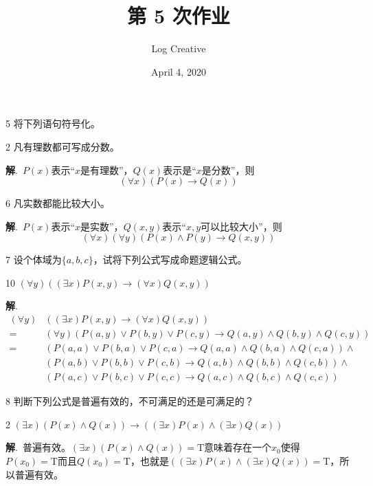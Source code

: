 \documentclass[12pt]{article}
\title{第 5 次作业}
\author{Log Creative}
\date{April 4, 2020}
\newenvironment{firstlayer}%
{\begin{list}{}{\renewcommand{\makelabel}[1]{\textbf{##1}.\hfil}
}}
{\end{list}}
\newenvironment{secondlayer}%
{\begin{list}{}{\renewcommand{\makelabel}[1]{(##1)\hfil}
}}
{\end{list}}
\providecommand{\sol}{\textbf{解}.~}
\begin{document}
\begin{CJK}{UTF8}{gbsn}

\maketitle

\begin{firstlayer}
  \item[5]将下列语句符号化。
  \begin{secondlayer}
    \item[2]凡有理数都可写成分数。
    
    \sol $P(x)$表示“$x$是有理数”，$Q(x)$表示是“$x$是分数”，则
$$
(\forall x)(P(x)\rightarrow Q(x))
$$
    \item[6]凡实数都能比较大小。
    
    \sol $P(x)$表示“$x$是实数”，$Q(x,y)$表示“$x,y$可以比较大小”，则
$$
(\forall x)(\forall y)(P(x)\wedge P(y)\rightarrow Q(x,y))
$$
  \end{secondlayer}
  \item[7]设个体域为$\{ a,b,c\}$，试将下列公式写成命题逻辑公式。
  \begin{secondlayer}
    \item[10]$(\forall y)((\exists x)P(x,y)\rightarrow (\forall x)Q(x,y))$
    
    \sol 
    \begin{align*}
      (\forall y)&((\exists x)P(x,y)\rightarrow (\forall x)Q(x,y))\\
      =&(\forall y)(P(a,y)\vee P(b,y)\vee P(c,y)\rightarrow Q(a,y)\wedge Q(b,y)\wedge Q(c,y))\\
      =&(P(a,a)\vee P(b,a)\vee P(c,a)\rightarrow Q(a,a)\wedge Q(b,a)\wedge Q(c,a))\wedge\\
      &(P(a,b)\vee P(b,b)\vee P(c,b)\rightarrow Q(a,b)\wedge Q(b,b)\wedge Q(c,b))\wedge\\
      &(P(a,c)\vee P(b,c)\vee P(c,c)\rightarrow Q(a,c)\wedge Q(b,c)\wedge Q(c,c))
    \end{align*}
  \end{secondlayer}
  \item[8]判断下列公式是普遍有效的，不可满足的还是可满足的？
  \begin{secondlayer}
    \item[2]$(\exists x)(P(x)\wedge Q(x))\rightarrow((\exists x)P(x)\wedge (\exists x)Q(x))$
    
    \sol 普遍有效。$(\exists x)(P(x)\wedge Q(x))=\text{T}$意味着存在一个$x_0$使得$P(x_0)=\text{T}$而且$Q(x_0)=\text{T}$，也就是$((\exists x)P(x)\wedge (\exists x)Q(x))=\text{T}$，所以普遍有效。
    

\end{secondlayer}
\end{firstlayer}
\end{CJK}
\end{document}
